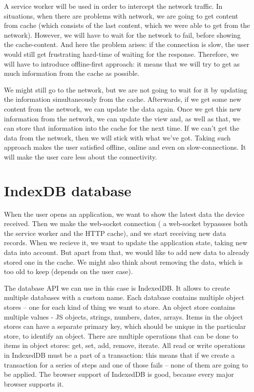 A service worker will be used in order to intercept the network traffic. In situations, when there are problems with network, we are going to get content from cache (which consists of the last content, which we were able to get from the network). However, we will have to wait for the network to fail, before showing the cache-content. And here the problem arises: if the connection is slow, the user would still get frustrating hard-time of waiting for the response. Therefore, we will have to introduce offline-first approach: it means that we will try to get as much information from the cache as possible. 

We might still go to the network, but we are not going to wait for it by updating the information simultaneously from the cache. Afterwards, if we get some new content from the network, we can update the data again. Once we get this new information from the network, we can update the view and, as well as that, we can store that information into the cache for the next time. If we can't get the data from the network, then we will stick with what we've got. Taking such approach makes the user satisfied offline, online and even on slow-connections. It will make the user care less about the connectivity. 

\section{IndexDB database}

When the user opens an application, we want to show the latest data the device received. Then we make the web-socket connection ( a web-socket bypassses both the service worker and the HTTP cache), and we start receiving new data records. When we recieve it, we want to update the application state, taking new data into account. But apart from that, we would like to add new data to already stored one in the cache. We might also think about removing the data, which is too old to keep (depends on the user case). 

The database API we can use in this case is IndexedDB. It allows to create multiple databases with a custom name. Each database contains multiple object stores -- one for each kind of thing we want to store. An object store contains multiple values - JS objects, strings, numbers, dates, arrays. Items in the object stores can have a separate primary key, which should be unique in the particular store, to identify an object. There are multiple operations that can be done to items in object stores: get, set, add, remove, iterate. All read or write operations in IndexedDB must be a part of a transaction: this means that if we create a transaction for a series of steps and one of those fails -- none of them are going to be applied. The browser support of IndexedDB is good, because every major browser supports it. 

